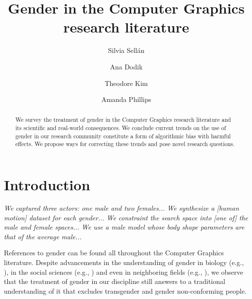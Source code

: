 \documentclass[sigconf,review,balance=false]{acmart}
\begin{document}
\title{Gender in the Computer Graphics research literature}

\author{Silvia Sellán}

\author{Ana Dodik}

\author{Theodore Kim}

\author{Amanda Phillips}


\begin{abstract}
    We survey the treatment of gender in the Computer Graphics research
    literature and its scientific and real-world consequences. We conclude
    current trends on the use of gender in our research community constitute a
    form of algorithmic bias with harmful effects. We propose ways for
    correcting these trends and pose novel research questions.
\end{abstract}


\maketitle


\section{Introduction}

\textit{We captured three actors: one male and two females...} \textit{We
synthesize a [human motion] dataset for each gender...} \textit{We constraint
the search space into [one of] the male and female spaces...} \textit{We use a
male model whose body shape parameters are that of the average male...}

References to gender can be found all throughout the Computer Graphics
literature. Despite advancements in the understanding of gender  in biology (e.g., \cite{fausto2012sex}), in the social sciences (e.g., \cite{butler2003gender}) and even in neighboring
fields (e.g., \cite{keyes2021you}), we observe that the treatment of gender in our discipline
still answers to a traditional understanding of it that excludes transgender and
gender non-conforming people.
\end{document}
